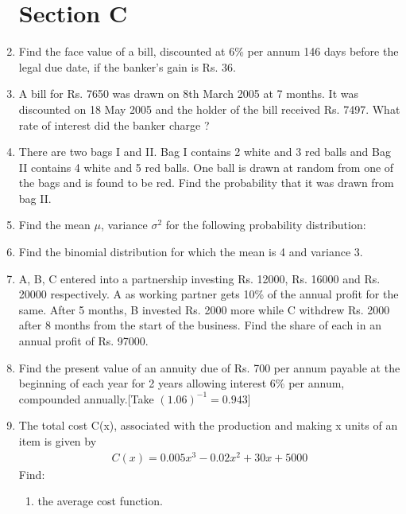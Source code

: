 \documentclass[journal,12pt,twocolumn]{IEEEtran}
\begin{document}
\begin{enumerate}
\section{Section C}
\item Find the face value of a bill, discounted at 6\% per annum 146 days before the legal due date, if the banker's gain is Rs. 36.
\item A bill for Rs. 7650 was drawn on 8th March 2005 at 7 months. It was discounted on 18 May 2005 and the holder of the bill received Rs. 7497. What rate of interest did the banker charge ?
\item There are two bags I and II. Bag I contains 2 white and 3 red balls and Bag II contains 4 white and 5 red balls. One ball is drawn at random from one of the bags and is found to be red. Find the probability that it was drawn from bag II.
\item Find the mean $\mu$, variance $\sigma^2$ for the following probability distribution:
\begin{table}[htb]
 \tiny
 \caption{}
 \end{table}
\item Find the binomial distribution for which the mean is 4 and variance 3.
\item A, B, C entered into a partnership investing Rs. 12000, Rs. 16000 and
Rs. 20000 respectively. A as working partner gets 10\% of the annual profit for
the same. After 5 months, B invested Rs. 2000 more while C withdrew Rs. 2000
after 8 months from the start of the business. Find the share of each in an
annual profit of Rs. 97000.
\item Find the present value of an annuity due of Rs. 700 per annum payable at the
beginning of each year for 2 years allowing interest 6\% per annum, compounded
annually.[Take $(1.06)^{-1} = 0.943$]
\item The total cost C(x), associated with the production and making x units of an item is given by
\begin{align}
   C(x) = 0.005x^3 - 0.02x^2 + 30x + 5000 \nonumber
\end{align}
Find:
\begin{enumerate}
\item the average cost function.

\end{enumerate}
\end{enumerate}
\end{document}
